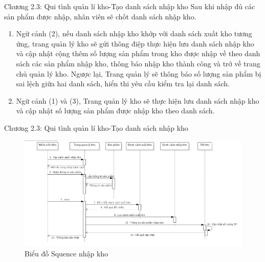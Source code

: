 \documentclass{beamer}
\begin{document}
\begin{frame}{Chương 2.3: Qui tình quản lí kho-Tạo danh sách nhập kho}
    Sau khi nhập đủ các sản phẩm được nhập, nhân viên sẽ chốt danh sách nhập kho. 
        \begin{enumerate}
            \item Ngữ cảnh (2), nếu danh sách nhập kho khớp với danh sách xuất kho tương ứng, trang quản lý kho sẽ gửi thông điệp thực hiện lưu danh sách nhập kho và cập nhật cộng thêm số lượng sản phẩm trong kho được nhập về theo danh sách các sản phẩm nhập kho, thông báo nhập kho thành công và trở về trang chủ quản lý kho. Ngược lại, Trang quản lý sẽ thông báo số lượng sản phẩm bị sai lệch giữa hai danh sách, hiển thi yêu cầu kiểm tra lại danh sách. 
            \item Ngữ cảnh (1) và (3), Trang quản lý kho sẽ thực hiện lưu danh sách nhập kho và cập nhật số lượng sản phẩm được nhập kho theo danh sách.
        \end{enumerate}
\end{frame}

\begin{frame}{Chương 2.3: Qui tình quản lí kho-Tạo danh sách nhập kho}

    \begin{figure}
        \centering
        \includegraphics[scale = 0.5]{11.png}
        \caption{Biểu đồ Squence nhập kho}
    \end{figure}
    
\end{frame}
\end{document}
